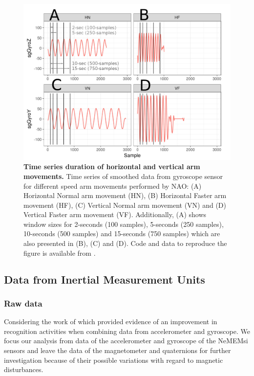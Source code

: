 \documentclass[fleqn,10pt]{wlscirep}
\begin{document}
\begin{figure}[ht] 
\centering
\includegraphics[width=1.0\textwidth]{figures/experiment/sts/pdf/sts}
    \caption{
	{\bf Time series duration of horizontal and vertical arm movements.} 
    		Time series of smoothed data from gyroscope sensor 
		for different speed arm movements performed by NAO: 
		(A) Horizontal Normal arm movement (HN), 
		(B) Horizontal Faster arm movement (HF),
		(C) Vertical Normal arm movement (VN) and 
		(D) Vertical Faster arm movement (VF).
		Additionally, 
		(A) shows window sizes for 2-seconds (100 samples), 
		5-seconds (250 samples), 10-seconds (500 samples) 
		and 15-seconds (750 samples)
		which are also presented in (B), (C) and (D).
		Code and data to reproduce the figure is available from \cite{srep2019}.
        }
	\label{fig:sts}
\end{figure}




\subsection*{Data from Inertial Measurement Units} 
	\label{sec:experiment:subsec:imu}
\subsubsection*{Raw data}
Considering the work of \cite{shoaib2016} which provided evidence of an 
improvement in recognition activities when combining data from 
accelerometer and gyroscope. We focus our analysis from data of the 
accelerometer and gyroscope of the NeMEMsi sensors \cite{Comotti2014} and 
leave the data of the magnetometer and quaternions for further investigation 
because of their possible variations with regard to magnetic disturbances.
\end{document}
